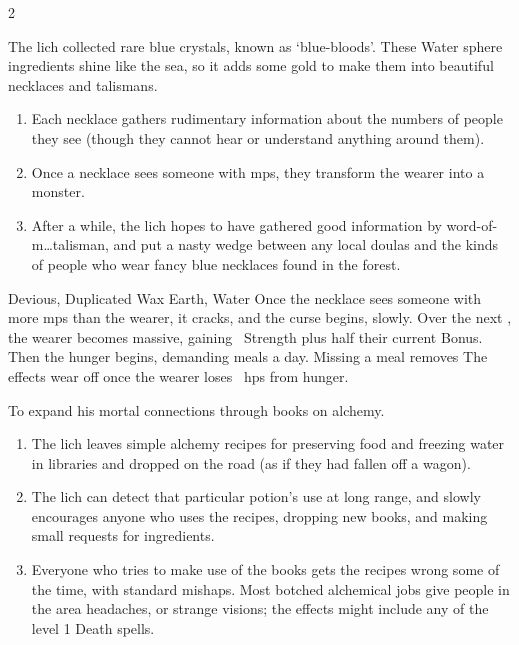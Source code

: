 \begin{multicols}{2}
\begin{dlist}
  The \gls{lich} collected rare blue crystals, known as `blue-bloods'.
  These Water \gls{sphere} \glspl{ingredient} shine like the sea, so it adds some gold to make them into beautiful necklaces and \glspl{talisman}.
  \begin{enumerate}
    \item
    Each necklace gathers rudimentary information about the numbers of people they see (though they cannot hear or understand anything around them).
    \item
    Once a necklace sees someone with \glspl{mp}, they transform the wearer into a monster.
    \item
    After a while, the \gls{lich} hopes to have gathered good information by word-of-m\ldots \gls{talisman}, and put a nasty wedge between any local \glspl{doula} and the kinds of people who wear fancy blue necklaces found in the forest.
  \end{enumerate}
      {Devious, Duplicated}%
      {Wax}%
      {Earth, Water}%
      {}%
      {Once the necklace sees someone with more \glspl{mp} than the wearer, it cracks, and the curse begins, slowly.
      Over the next \showOnset, the wearer becomes massive, gaining ~Strength plus half their current Bonus.
      Then the hunger begins, demanding  meals a day.
      Missing a meal removes }%
      {
      The effects wear off once the wearer loses ~\glspl{hp} from hunger.}%
    \showTalisman
  \item
  To expand his mortal connections through books on \gls{alchemy}.
  \begin{enumerate}
    \item
    The \gls{lich} leaves simple \gls{alchemy} recipes for preserving food and freezing water in libraries and dropped on the road (as if they had fallen off a wagon).
    \item
    The \gls{lich} can detect that particular potion's use at long range, and slowly encourages anyone who uses the recipes, dropping new books, and making small requests for \glspl{ingredient}.
    \item
    Everyone who tries to make use of the books gets the recipes wrong some of the time, with standard mishaps.
    Most botched alchemical jobs give people in the area headaches, or strange visions; the effects might include any of the level 1 Death spells.%
  \end{enumerate}
\end{dlist}

\end{multicols}

